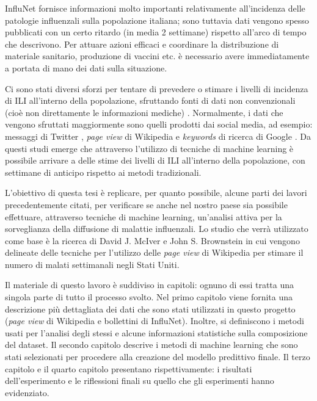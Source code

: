 InfluNet fornisce informazioni molto importanti relativamente all'incidenza delle patologie influenzali sulla popolazione
italiana; sono tuttavia dati vengono spesso pubblicati con un certo ritardo (in media 2 settimane) rispetto all'arco di tempo 
che descrivono. Per attuare azioni efficaci e coordinare la distribuzione di materiale sanitario, produzione di vaccini etc. 
è necessario avere immediatamente a portata di mano dei dati sulla situazione. 
\bigskip

Ci sono stati diversi sforzi per tentare di prevedere o stimare i livelli di incidenza di ILI all'interno della popolazione,
sfruttando fonti di dati non convenzionali (cioè non direttamente le informazioni mediche) \cite{McIver2014, Hickmann2015, 
Generous2014, googleflutrends, Signorini2011}. Normalmente, i dati che vengono sfruttati 
maggiormente sono quelli prodotti dai social media, ad esempio: messaggi di Twitter \cite{Signorini2011}, \textit{page view} 
di Wikipedia \cite{McIver2014, Hickmann2015, Generous2014} e \textit{keywords} di ricerca di Google \cite{googleflutrends}. 
Da questi studi emerge che attraverso l'utilizzo di tecniche di machine learning è possibile arrivare a delle stime dei 
livelli di ILI all'interno della popolazione, con settimane di anticipo rispetto ai metodi tradizionali.
\bigskip

L'obiettivo di questa tesi è replicare, per quanto possibile, alcune parti dei lavori precedentemente citati, per
verificare se anche nel nostro paese sia possibile effettuare, attraverso tecniche di machine learning, un'analisi
attiva per la sorveglianza della diffusione di malattie influenzali. Lo studio che verrà utilizzato come base 
è la ricerca di David J. McIver e John S. Brownstein \cite{McIver2014} in cui vengono delineate delle tecniche per 
l'utilizzo delle \textit{page view} di Wikipedia per stimare il numero di malati settimanali negli Stati Uniti.
\bigskip

Il materiale di questo lavoro è suddiviso in capitoli: ognuno di essi tratta una singola parte di tutto il processo svolto. 
Nel primo capitolo viene fornita una descrizione più dettagliata dei dati che sono stati utilizzati in questo progetto
(\textit{page view} di Wikipedia e bollettini di InfluNet). Inoltre, si definiscono i metodi usati per l'analisi degli 
stessi e alcune informazioni statistiche sulla composizione del dataset.
Il secondo capitolo descrive i metodi di machine learning che sono stati selezionati per procedere alla creazione
del modello predittivo finale.
Il terzo capitolo e il quarto capitolo presentano rispettivamente: i risultati dell'esperimento e le riflessioni finali su 
quello che gli esperimenti hanno evidenziato.
\newpage




